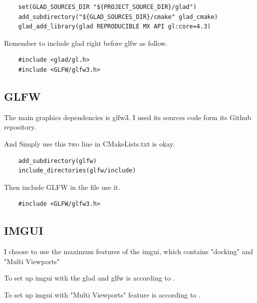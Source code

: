 \documentclass{article}
\theoremstyle{definition} %
\begin{document}
\begin{verbatim}
    set(GLAD_SOURCES_DIR "${PROJECT_SOURCE_DIR}/glad")
    add_subdirectory("${GLAD_SOURCES_DIR}/cmake" glad_cmake)
    glad_add_library(glad REPRODUCIBLE MX API gl:core=4.3)
\end{verbatim}

Remember to include glad right before glfw as
follow.

\begin{verbatim}
    #include <glad/gl.h>
    #include <GLFW/glfw3.h>
\end{verbatim}

\subsection[GLFW]{GLFW}
The main graphics dependencies is glfw3.
I used its sources code form its Github
repository.

And Simply use this two line in CMakeLists.txt
is okay.

\begin{verbatim}
    add_subdirectory(glfw)
    include_directories(glfw/include)
\end{verbatim}

Then include GLFW in the file use it.

\begin{verbatim}
    #include <GLFW/glfw3.h>
\end{verbatim}

\subsection[IMGUI]{IMGUI}
I choose to use the maximum features of the
imgui, which contains "docking" and
"Multi Viewports"

To set up imgui with the glad and glfw is
according to
\cite[setupImgui]{example-if-you-are-using-glfw--openglwebgl}.

To set up imgui with "Multi Viewports" feature
is according to
\cite[text]{Multi-Viewports}.
\end{document}
